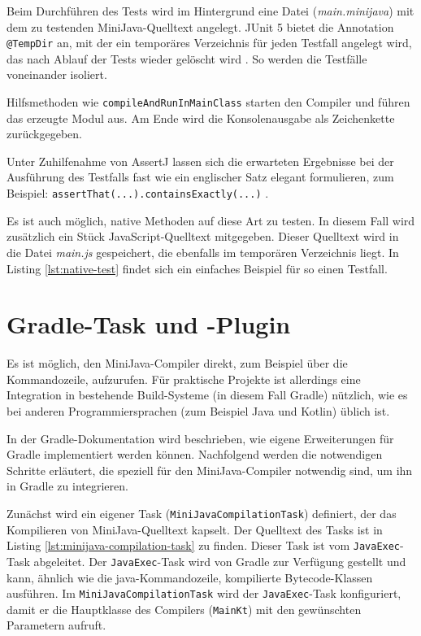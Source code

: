\pagebreak


Beim Durchführen des Tests wird im Hintergrund eine Datei (\emph{main.minijava}) mit dem zu testenden MiniJava-Quelltext angelegt. JUnit 5 bietet die Annotation \lstinline{@TempDir} an, mit der ein temporäres Verzeichnis für jeden Testfall angelegt wird, das nach Ablauf der Tests wieder gelöscht wird \cite{JUnit}. So werden die Testfälle voneinander isoliert.

Hilfsmethoden wie \lstinline{compileAndRunInMainClass} starten den Compiler und führen das erzeugte Modul aus. Am Ende wird die Konsolenausgabe als Zeichenkette zurückgegeben.

Unter Zuhilfenahme von AssertJ lassen sich die erwarteten Ergebnisse bei der Ausführung des Testfalls fast wie ein englischer Satz elegant formulieren, zum Beispiel: \lstinline{assertThat(...).containsExactly(...)} \cite{AssertJ}.

Es ist auch möglich, native Methoden auf diese Art zu testen. In diesem Fall wird zusätzlich ein Stück JavaScript-Quelltext mitgegeben. Dieser Quelltext wird in die Datei \emph{main.js} gespeichert, die ebenfalls im temporären Verzeichnis liegt. In Listing \ref{lst:native-test} findet sich ein einfaches Beispiel für so einen Testfall.



\pagebreak
\section{Gradle-Task und -Plugin}
\label{sec:GradleTask-und-Plugin}

Es ist möglich, den MiniJava-Compiler direkt, zum Beispiel über die Kommandozeile, aufzurufen. Für praktische Projekte ist allerdings eine Integration in bestehende Build-Systeme (in diesem Fall Gradle) nützlich, wie es bei anderen Programmiersprachen (zum Beispiel Java und Kotlin) üblich ist.

In der Gradle-Dokumentation \cite{Gradle} wird beschrieben, wie eigene Erweiterungen für Gradle implementiert werden können. Nachfolgend werden die notwendigen Schritte erläutert, die speziell für den MiniJava-Compiler notwendig sind, um ihn in Gradle zu integrieren.

Zunächst wird ein eigener Task (\lstinline{MiniJavaCompilationTask}) definiert, der das Kompilieren von MiniJava-Quelltext kapselt. Der Quelltext des Tasks ist in Listing \ref{lst:minijava-compilation-task} zu finden. Dieser Task ist vom \lstinline{JavaExec}-Task abgeleitet. Der \lstinline{JavaExec}-Task wird von Gradle zur Verfügung gestellt und kann, ähnlich wie die java-Komman\-dozeile, kompilierte Bytecode-Klassen ausführen. Im \lstinline{MiniJavaCompilationTask} wird der \lstinline{JavaExec}-Task konfiguriert, damit er die Hauptklasse des Compilers (\lstinline{MainKt}) mit den gewünschten Parametern aufruft.

